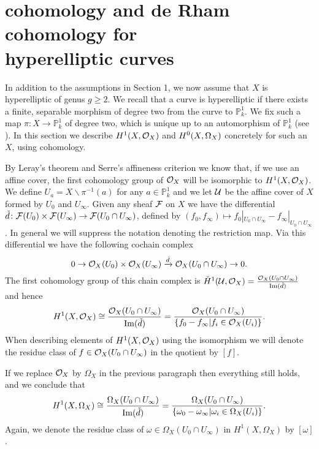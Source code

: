 \section{\cech cohomology and de Rham cohomology for\\ hyperelliptic curves}

In addition to the assumptions in Section 1, we now assume that $X$ is hyperelliptic of genus $g \geq 2$.
We recall that a curve is hyperelliptic if there exists a finite, separable morphism of degree two from the curve to $\mathbb P_k^1$.
We fix such a map $\pi \colon X \rightarrow \mathbb P_k^1$ of degree two, which is unique up to an automorphism of $\mathbb P_k^1$ (see \cite[Rem.\ 7.4.30]{liu}).
In this section we describe $H^1(X,\mathcal{O}_X)$ and ${H^0(X,\Omega_X)}$ concretely for such an $X$, using \cech cohomology.

By Leray's theorem \cite[Thm.\ 5.2.12]{liu} and Serre's affineness criterion \cite[Thm.\ 5.2.23]{liu} we know that, if we use an affine cover, the first \cech cohomology group of ${\cal O}_X$ will be isomorphic to $H^1(X,\mathcal{O}_X)$.
We define $U_a = X \backslash \pi^{-1}(a)$ for any $a \in \mathbb P_k^1$ and we let ${\cal U}$ be the affine cover of $X$ formed by $U_0$ and $U_\infty$.
Given any sheaf $\cal F$ on $X$ we have the \cech differential $\check{d}\colon {\cal F}(U_0) \times {\cal F} (U_\infty) \rightarrow {\cal F}(U_0 \cap U_\infty)$, defined by $(f_0,f_\infty) \mapsto f_0|_{U_0 \cap U_\infty} - f_\infty|_{U_0 \cap U_\infty}$.
In general we will suppress the notation denoting the restriction map.
Via this differential we have the following cochain complex
    \begin{equation*}
    0 \rightarrow {\cal O}_X(U_0)\times {\cal O}_X(U_\infty) \xrightarrow{\check{d}} {\cal O}_X(U_0 \cap U_\infty) \rightarrow 0.
    \end{equation*}
The first cohomology group of this chain complex is $\check{H}^1(\mathcal U,\mathcal O_X) = \frac{{\cal O}_X(U_0 \cap U_\infty)}{\operatorname{Im}(\check{d})}$ and hence
    \begin{equation}\label{equationcechhoneisomorphismfunctions}
    H^1(X,\mathcal{O}_X) \cong \frac{{\cal O}_X(U_0 \cap U_\infty)}{\operatorname{Im}(\check{d})}  
     = \frac{{\cal O}_X(U_0 \cap U_\infty)}{\{f_0 - f_\infty | f_i \in {\cal O}_X(U_i) \}}.
    \end{equation}
When describing elements of $H^1(X,\mathcal{O}_X)$ using the isomorphism we will denote the residue class of $f \in {\cal O}_X(U_0 \cap U_\infty)$ in the quotient by $[f]$.

If we replace ${\cal O}_X$ by $\Omega_X$ in the previous paragraph then everything still holds, and we conclude that
    \begin{equation}\label{equationcechhoneisomorphismdifferentials}
    H^1(X,\Omega_X) \cong \frac{\Omega_X(U_0 \cap U_\infty)}{\operatorname{Im}(\check{d})} = \frac{\Omega_X(U_0 \cap U_\infty)}{\{\omega_0 - \omega_ \infty | \omega_i \in \Omega_X(U_i)\}}.
    \end{equation}
Again, we denote the residue class of $\omega \in \Omega_X(U_0 \cap U_\infty)$ in $H^1(X,\Omega_X)$ by $[\omega]$.

